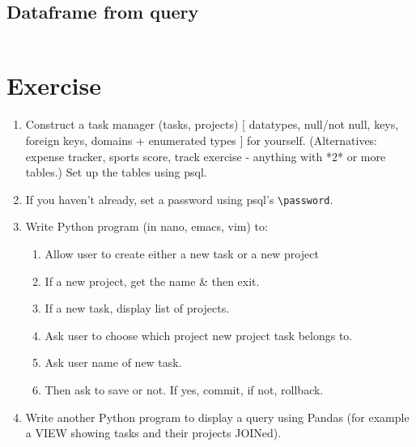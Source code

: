 \documentclass{pgnotes}
\begin{document}
\subsection{Dataframe from query}\label{sec:dataframe-from-query}

\inputminted{python}{dataframe_from_query.py}

\section{Exercise}\label{exercise}

\begin{enumerate}
\item
  Construct a task manager (tasks, projects) {[} datatypes, null/not
  null, keys, foreign keys, domains + enumerated types {]} for yourself.
  (Alternatives: expense tracker, sports score, track exercise -
  anything with *2* or more tables.) Set up the tables using psql.
\item
  If you haven't already, set a password using psql's
  \texttt{\textbackslash{}password}.
\item
  Write Python program (in nano, emacs, vim) to:

  \begin{enumerate}
  \def\labelenumii{\arabic{enumii}.}
  \item
    Allow user to create either a new task or a new project
  \item
    If a new project, get the name \& then exit.
  \item
    If a new task, display list of projects.
  \item
    Ask user to choose which project new project task belongs to.
  \item
    Ask user name of new task.
  \item
    Then ask to save or not. If yes, commit, if not, rollback.
  \end{enumerate}
\item
  Write another Python program to display a query using Pandas (for
  example a VIEW showing tasks and their projects JOINed).
\end{enumerate}
\end{document}
